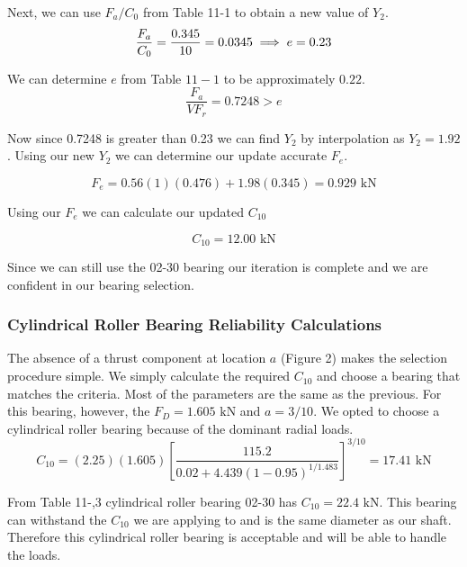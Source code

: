 \documentclass[letterpaper,12pt]{article}
\begin{document}
\noindent Next, we can use $F _ { a } / C _ { 0 }$ from Table 11-1 to obtain a new value of $Y _ { 2 }$.
\begin{equation*}
\notag
\frac { F _a } { C _ { 0 } } = \frac { 0.345 } { 10 } = 0.0345 \implies e = 0.23
\end{equation*}

\noindent We can determine $e$ from Table $11 - 1$ to be approximately $0.22 .$ \\
\begin{equation*}
\frac { F_a } { V F _ { r } } = 0.7248 > e
\end{equation*}

\noindent Now since 0.7248 is greater than 0.23 we can find $Y _ { 2 }$ by interpolation as $Y_2 = 1.92$. Using our new $Y_2$ we can determine our update accurate $F_e$.

\begin{equation*}
F_e = 0.56 ( 1 )( 0.476 ) + 1.98( 0.345 ) = 0.929 \text{ kN}
\end{equation*}

\noindent Using our $F_e$ we can calculate our updated $C_{10}$

\begin{equation*}
    C _ { 10 } = 12.00 \text{ kN}
\end{equation*}

\noindent Since we can still use the 02-30 bearing our iteration is complete and we are confident in our bearing selection.

\subsubsection{Cylindrical Roller Bearing Reliability Calculations}

The absence of a thrust component at location $a$ (Figure 2) makes the selection procedure simple. We simply calculate the required $C_{10}$ and choose a bearing that matches the criteria. Most of the parameters are the same as the previous. For this bearing, however, the $F_D = 1.605 \text{ kN}$ and $a = 3/10$. We opted to choose a cylindrical roller bearing because of the dominant radial loads.
\begin{equation*}
C _ { 10 }  = ( 2.25 ) ( 1.605 ) \left[ \frac { 115.2 } { 0.02 + 4.439 ( 1 - 0.95 ) ^ { 1 / 1.483 } } \right] ^ { 3/10 } = 17.41 \text{ kN}
\end{equation*}

\noindent From Table 11-,3 cylindrical roller bearing 02-30 has $C _ { 10 } = 22.4 \text{ kN}$. This bearing can withstand the $C_{10}$ we are applying to and is the same diameter as our shaft. Therefore this cylindrical roller bearing is acceptable and will be able to handle the loads.
\end{document}
